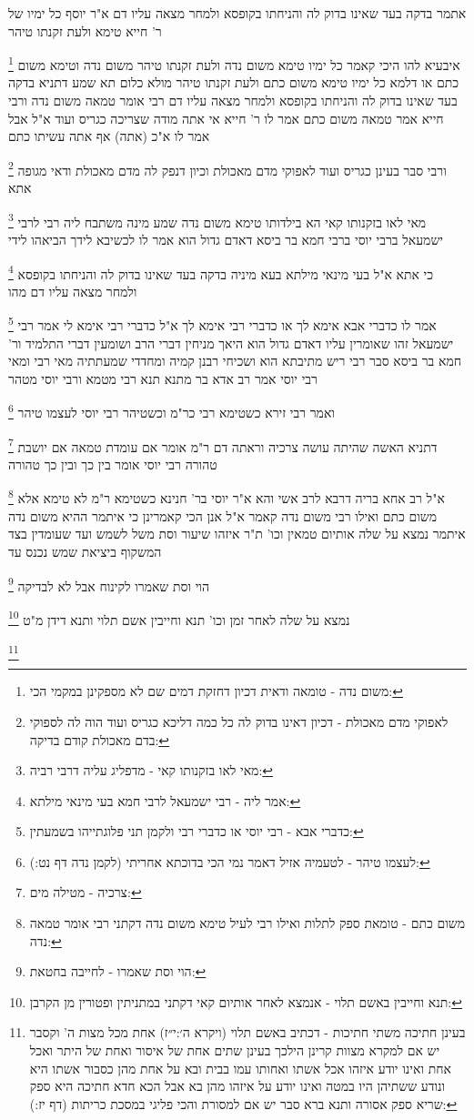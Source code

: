 \documentclass[12pt, openany]{book}
\newcommand{\footnotecomment}[1]{
	\renewcommand\thefootnote{}
	\footnote{#1}}
\newcommand{\commenta}[1]{\footnotecomment{#1}}
\begin{document}
{{אתמר בדקה בעד שאינו בדוק לה והניחתו בקופסא ולמחר מצאה עליו דם א"ר יוסף כל ימיו של ר' חייא טימא ולעת זקנתו טיהר 
\commenta{משום נדה - טומאה ודאית דכיון דחזקת דמים שם לא מספקינן במקמי הכי:}
איבעיא להו היכי קאמר כל ימיו טימא משום נדה ולעת זקנתו טיהר משום נדה וטימא משום כתם 
או דלמא כל ימיו טימא משום כתם ולעת זקנתו טיהר מולא כלום 
תא שמע דתניא בדקה בעד שאינו בדוק לה והניחתו בקופסא ולמחר מצאה עליו דם רבי אומר טמאה משום נדה ורבי חייא אמר טמאה משום כתם
אמר לו ר' חייא אי אתה מודה שצריכה כגריס ועוד א"ל אבל אמר לו א"כ (אתה) אף אתה עשיתו כתם 
\commenta{לאפוקי מדם מאכולת - דכיון דאינו בדוק לה כל כמה דליכא כגריס ועוד הוה לה לספוקי בדם מאכולת קודם בדיקה:}
ורבי סבר בעינן כגריס ועוד לאפוקי מדם מאכולת וכיון דנפק לה מדם מאכולת ודאי מגופה אתא 
\commenta{מאי לאו בזקנותו קאי - מדפליג עליה דרבי רביה:}
מאי לאו בזקנותו קאי הא בילדותו טימא משום נדה שמע מינה 
משתבח ליה רבי לרבי ישמעאל ברבי יוסי ברבי חמא בר ביסא דאדם גדול הוא אמר לו לכשיבא לידך הביאהו לידי 
\commenta{אמר ליה - רבי ישמעאל לרבי חמא בעי מינאי מילתא:}
כי אתא א"ל בעי מינאי מילתא בעא מיניה בדקה בעד שאינו בדוק לה והניחתו בקופסא ולמחר מצאה עליו דם מהו 
\commenta{כדברי אבא - רבי יוסי או כדברי רבי ולקמן תני פלוגתייהו בשמעתין:}
אמר לו כדברי אבא אימא לך או כדברי רבי אימא לך א"ל כדברי רבי אימא לי 
אמר רבי ישמעאל זהו שאומרין עליו דאדם גדול הוא היאך מניחין דברי הרב ושומעין דברי התלמיד 
ור' חמא בר ביסא סבר רבי ריש מתיבתא הוא ושכיחי רבנן קמיה ומחדדי שמעתתיה 
מאי רבי ומאי רבי יוסי אמר רב אדא בר מתנא תנא רבי מטמא ורבי יוסי מטהר 
\commenta{לעצמו טיהר - לטעמיה אזיל דאמר נמי הכי בדוכתא אחריתי (לקמן נדה דף נט:):}
ואמר רבי זירא כשטימא רבי כר"מ וכשטיהר רבי יוסי לעצמו טיהר 
\commenta{צרכיה - מטילה מים:}
דתניא האשה שהיתה עושה צרכיה וראתה דם ר"מ אומר אם עומדת טמאה אם יושבת טהורה 
רבי יוסי אומר בין כך ובין כך טהורה 
\commenta{משום כתם - טומאת ספק לתלות ואילו רבי לעיל טימא משום נדה דקתני רבי אומר טמאה נדה:}
א"ל רב אחא בריה דרבא לרב אשי והא א"ר יוסי בר' חנינא כשטימא ר"מ לא טימא אלא משום כתם ואילו רבי משום נדה קאמר א"ל אנן הכי קאמרינן כי איתמר ההיא משום נדה איתמר
נמצא על שלה אותיום טמאין וכו' ת"ר איזהו שיעור וסת משל לשמש ועד שעומדין בצד המשקוף ביציאת שמש נכנס עד
\commenta{הוי וסת שאמרו - לחייבה בחטאת:}
הוי וסת שאמרו לקינוח אבל לא לבדיקה
\commenta{תנא וחייבין באשם תלוי - אנמצא לאחר אותיום קאי דקתני במתניתין ופטורין מן הקרבן:}
נמצא על שלה לאחר זמן וכו' תנא וחייבין אשם תלוי ותנא דידן מ"ט 
\commenta{בעינן חתיכה משתי חתיכות - דכתיב באשם תלוי (ויקרא ה׳:י״ז) אחת מכל מצות ה' וקסבר יש אם למקרא מצוות קרינן הילכך בעינן שתים אחת של איסור ואחת של היתר ואכל אחת ואינו יודע איזהו אכל אשתו ואחותו עמו בבית ובא על אחת מהן כסבור אשתו היא ונודע ששתיהן היו במטה ואינו יודע על איזהו מהן בא אבל הכא חדא חתיכה היא ספק שריא ספק אסורה ותנא ברא סבר יש אם למסורת והכי פליגי במסכת כריתות (דף יז:):}
}}
\end{document}
